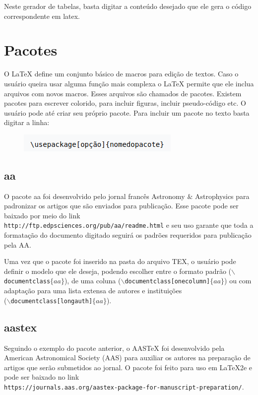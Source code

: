 \documentclass[12pt]{article}
\begin{document}
			Neste gerador de tabelas, basta digitar a conteúdo desejado que ele gera o código correspondente em latex.
		
			
	\section{Pacotes}
		O LaTeX define um conjunto básico de macros para edição de textos. Caso o usuário queira usar alguma função mais complexa o LaTeX permite que ele inclua arquivos com novos macros. Esses arquivos são chamados de pacotes. Existem pacotes para escrever colorido, para incluir figuras, incluir pseudo-código etc. O usuário pode até criar seu próprio pacote. Para incluir um pacote no texto basta digitar a linha:
	
		\begin{figure}[h]
			\centering
			\includegraphics[scale=0.6]{pa.png}
		\end{figure}	
	
		\subsection{aa}
			O pacote aa foi desenvolvido pelo jornal francês Astronomy $\&$ Astrophysics para padronizar os artigos que são enviados para publicação. Esse pacote pode ser baixado por meio do link \\\texttt{http://ftp.edpsciences.org/pub/aa/readme.html} e seu uso garante que toda a formatação do documento digitado seguirá os padrões requeridos para publicação pela AA.
			
			Uma vez que o pacote foi inserido na pasta do arquivo TEX, o usuário pode definir o modelo que ele deseja, podendo escolher entre o formato padrão (\texttt{$\backslash$documentclass$\{aa\}$}), de uma coluna (\texttt{$\backslash$documentclass[onecolumn]$\{aa\}$}) ou com adaptação para uma lista extensa de autores e instituições \\(\texttt{$\backslash$documentclass[longauth]$\{aa\}$}).
		
		\subsection{aastex}
			Seguindo o exemplo do pacote anterior, o AASTeX foi desenvolvido pela American Astronomical Society (AAS) para auxiliar os autores na preparação de artigos que serão submetidos ao jornal. O pacote foi feito para uso em LaTeX2e e pode ser baixado no link\\ \texttt{https://journals.aas.org/aastex-package-for-manuscript-preparation/}.
			
\end{document}

